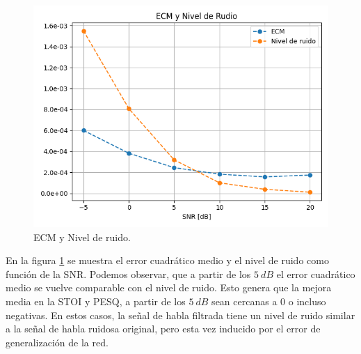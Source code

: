 \begin{figure}
	\centering
	\centerline{\includegraphics[scale=0.8]{images/ch7/ecm_and_noise_level.png}}
	\caption{ECM y Nivel de ruido.}
	\label{fig:ch7_mse_and_noise_level}
\end{figure}

En la figura \ref{fig:ch7_mse_and_noise_level} se muestra el error cuadrático medio y el nivel de ruido como función de la SNR. Podemos observar, que a partir de los $\SI{5}{dB}$ el error cuadrático medio se vuelve comparable con el nivel de ruido. Esto genera que la mejora media en la STOI y PESQ, a partir de los $\SI{5}{dB}$ sean cercanas a 0 o incluso negativas. En estos casos, la señal de habla filtrada tiene un nivel de ruido similar a la señal de habla ruidosa original, pero esta vez inducido por el error de generalización de la red.